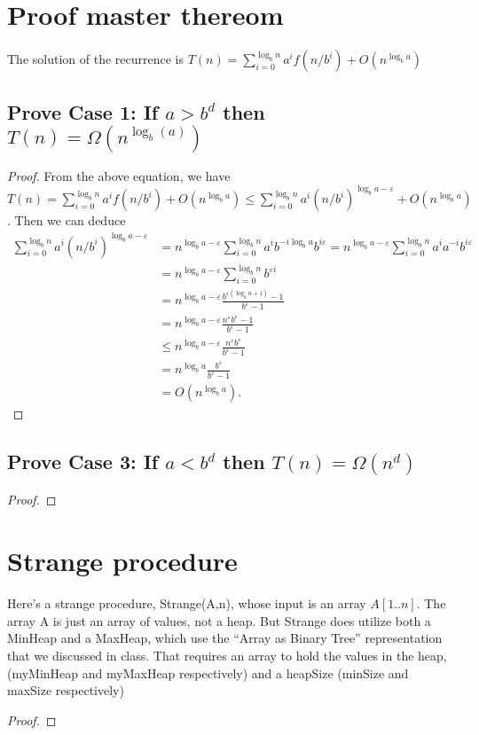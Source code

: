 \documentclass[a4paper]{article}
\begin{document}
\section{Proof master thereom}
The solution of the recurrence is $T(n)=\sum_{i=0}^{\log _b n} a^i f\left(n / b^i\right)+O\left(n^{\log _b a}\right)$
\subsection{Prove Case 1: If $a>b^d$ then $T(n)=\Omega\left(n^{ \log _b(a)}\right)$}
\begin{proof}
  From the above equation, we have $T(n)=\sum_{i=0}^{\log _b n} a^i f\left(n / b^i\right)+O\left(n^{\log _b a}\right) \leq \sum_{i=0}^{\log _b n} a^i\left(n / b^i\right)^{\log _b a-\varepsilon}+O\left(n^{\log _b a}\right)$. Then we can deduce
$$
  \begin{aligned}
    \sum_{i=0}^{\log _b n} a^i\left(n / b^i\right)^{\log _b a-\varepsilon} &=n^{\log _b a-\varepsilon} \sum_{i=0}^{\log _b n} a^i b^{-i \log _b a} b^{i \varepsilon}=n^{\log _b a-\varepsilon} \sum_{i=0}^{\log _b n} a^i a^{-i} b^{i \varepsilon} \\
    &=n^{\log _b a-\varepsilon} \sum_{i=0}^{\log _b n} b^{\varepsilon i}
    \\ &=n^{\log _b a-\varepsilon} \frac{b^{\varepsilon\left(\log _b n+1\right)}-1}{b^{\varepsilon}-1} \\
    &=n^{\log _b a-\varepsilon} \frac{n^{\varepsilon} b^{\varepsilon}-1}{b^{\varepsilon}-1}\\& \leq n^{\log _b a-\varepsilon} \frac{n^{\varepsilon} b^{\varepsilon}}{b^{\varepsilon}-1}\\ 
    &=n^{\log _b a} \frac{b^{\varepsilon}}{b^{\varepsilon}-1} \\
    &=O\left(n^{\log _b a}\right) .
    \end{aligned}
    $$
\end{proof}
\subsection{Prove Case 3: If $a<b^d$ then $T(n)=\Omega\left(n^d\right)$}
\begin{proof}

\end{proof}
\section{Strange procedure}
Here's a strange procedure, Strange(A,n), whose input is an array $A[1..n]$.
The array A is just an array of values, not a heap. But Strange does utilize both a MinHeap and a MaxHeap, which use the “Array as Binary Tree” representation that we discussed in class. That requires an array to
hold the values in the heap, (myMinHeap and myMaxHeap respectively) and a
heapSize (minSize and maxSize respectively)
\begin{proof}

\end{proof}
\end{document}
